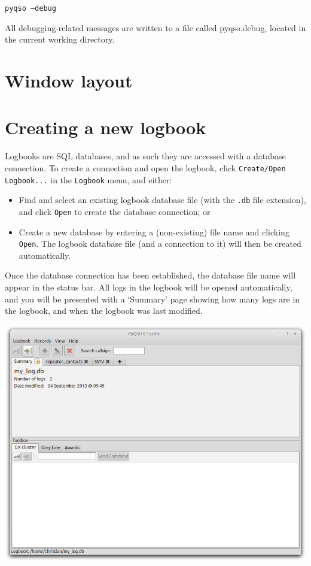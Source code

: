 \documentclass[11pt, a4paper]{report}
\begin{document}
  \texttt{pyqso --debug}

\noindent All debugging-related messages are written to a file called pyqso.debug, located in the current working directory.


\section{Window layout}



\section{Creating a new logbook}
Logbooks are SQL databases, and as such they are accessed with a database connection. To create a connection and open the logbook, click \texttt{Create/Open Logbook...} in the \texttt{Logbook} menu, and either:
\begin{itemize}
  \item Find and select an existing logbook database file (with the \texttt{.db} file extension), and click \texttt{Open} to create the database connection; or
  \item Create a new database by entering a (non-existing) file name and clicking \texttt{Open}. The logbook database file (and a connection to it) will then be created automatically.
\end{itemize}
Once the database connection has been established, the database file name will appear in the status bar. All logs in the logbook will be opened automatically, and you will be presented with a `Summary' page showing how many logs are in the logbook, and when the logbook was last modified.

\begin{center}
  \includegraphics[width=1\columnwidth]{images/summary.png}
\end{center}
\end{document}
